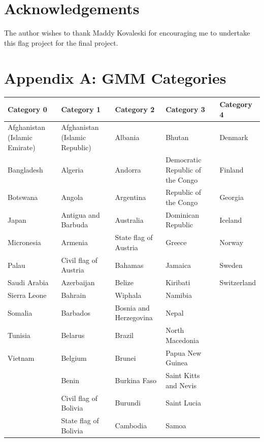 \documentclass[11pt]{amsart}
\begin{document}
\section*{Acknowledgements}

The author wishes to thank Maddy Kovaleski for encouraging me to undertake this
flag project for the final project.



\appendix
\section*{Appendix A: GMM Categories}
\begin{table}[h]
    \centering
    \begin{tabular}{lllll}
        \hline
        \textbf{Category 0} & \textbf{Category 1} & \textbf{Category 2} & \textbf{Category 3} & \textbf{Category 4} \\
        \hline
        Afghanistan (Islamic Emirate) & Afghanistan (Islamic Republic) & Albania & Bhutan & Denmark \\
        Bangladesh & Algeria & Andorra & Democratic Republic of the Congo & Finland \\
        Botswana & Angola & Argentina & Republic of the Congo & Georgia \\
        Japan & Antigua and Barbuda & Australia & Dominican Republic & Iceland \\
        Micronesia & Armenia & State flag of Austria & Greece & Norway \\
        Palau & Civil flag of Austria & Bahamas & Jamaica & Sweden \\
        Saudi Arabia & Azerbaijan & Belize & Kiribati & Switzerland \\
        Sierra Leone & Bahrain & Wiphala & Namibia & \\
        Somalia & Barbados & Bosnia and Herzegovina & Nepal & \\
        Tunisia & Belarus & Brazil & North Macedonia & \\
        Vietnam & Belgium & Brunei & Papua New Guinea & \\
        & Benin & Burkina Faso & Saint Kitts and Nevis & \\
        & Civil flag of Bolivia & Burundi & Saint Lucia & \\
        & State flag of Bolivia & Cambodia & Samoa & \\

\end{tabular}
\end{table}
\end{document}
